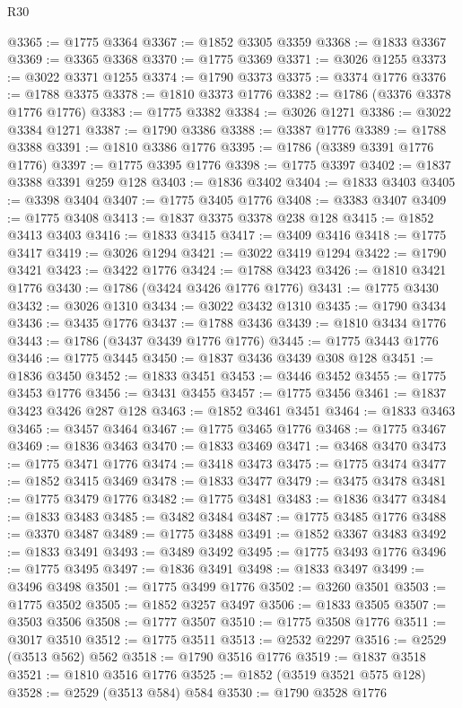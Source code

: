 \begin{lexlean}{R30}
\begin{coremodule}
{{{{{@3365 := @1775 @3364
@3367 := @1852 @3305 @3359
@3368 := @1833 @3367
@3369 := @3365 @3368
@3370 := @1775 @3369
@3371 := @3026 @1255
@3373 := @3022 @3371 @1255
@3374 := @1790 @3373
@3375 := @3374 @1776
@3376 := @1788 @3375
@3378 := @1810 @3373 @1776
@3382 := @1786 (@3376 @3378 @1776 @1776)
@3383 := @1775 @3382
@3384 := @3026 @1271
@3386 := @3022 @3384 @1271
@3387 := @1790 @3386
@3388 := @3387 @1776
@3389 := @1788 @3388
@3391 := @1810 @3386 @1776
@3395 := @1786 (@3389 @3391 @1776 @1776)
@3397 := @1775 @3395 @1776
@3398 := @1775 @3397
@3402 := @1837 @3388 @3391 @259 @128
@3403 := @1836 @3402
@3404 := @1833 @3403
@3405 := @3398 @3404
@3407 := @1775 @3405 @1776
@3408 := @3383 @3407
@3409 := @1775 @3408
@3413 := @1837 @3375 @3378 @238 @128
@3415 := @1852 @3413 @3403
@3416 := @1833 @3415
@3417 := @3409 @3416
@3418 := @1775 @3417
@3419 := @3026 @1294
@3421 := @3022 @3419 @1294
@3422 := @1790 @3421
@3423 := @3422 @1776
@3424 := @1788 @3423
@3426 := @1810 @3421 @1776
@3430 := @1786 (@3424 @3426 @1776 @1776)
@3431 := @1775 @3430
@3432 := @3026 @1310
@3434 := @3022 @3432 @1310
@3435 := @1790 @3434
@3436 := @3435 @1776
@3437 := @1788 @3436
@3439 := @1810 @3434 @1776
@3443 := @1786 (@3437 @3439 @1776 @1776)
@3445 := @1775 @3443 @1776
@3446 := @1775 @3445
@3450 := @1837 @3436 @3439 @308 @128
@3451 := @1836 @3450
@3452 := @1833 @3451
@3453 := @3446 @3452
@3455 := @1775 @3453 @1776
@3456 := @3431 @3455
@3457 := @1775 @3456
@3461 := @1837 @3423 @3426 @287 @128
@3463 := @1852 @3461 @3451
@3464 := @1833 @3463
@3465 := @3457 @3464
@3467 := @1775 @3465 @1776
@3468 := @1775 @3467
@3469 := @1836 @3463
@3470 := @1833 @3469
@3471 := @3468 @3470
@3473 := @1775 @3471 @1776
@3474 := @3418 @3473
@3475 := @1775 @3474
@3477 := @1852 @3415 @3469
@3478 := @1833 @3477
@3479 := @3475 @3478
@3481 := @1775 @3479 @1776
@3482 := @1775 @3481
@3483 := @1836 @3477
@3484 := @1833 @3483
@3485 := @3482 @3484
@3487 := @1775 @3485 @1776
@3488 := @3370 @3487
@3489 := @1775 @3488
@3491 := @1852 @3367 @3483
@3492 := @1833 @3491
@3493 := @3489 @3492
@3495 := @1775 @3493 @1776
@3496 := @1775 @3495
@3497 := @1836 @3491
@3498 := @1833 @3497
@3499 := @3496 @3498
@3501 := @1775 @3499 @1776
@3502 := @3260 @3501
@3503 := @1775 @3502
@3505 := @1852 @3257 @3497
@3506 := @1833 @3505
@3507 := @3503 @3506
@3508 := @1777 @3507
@3510 := @1775 @3508 @1776
@3511 := @3017 @3510
@3512 := @1775 @3511
@3513 := @2532 @2297
@3516 := @2529 (@3513 @562) @562
@3518 := @1790 @3516 @1776
@3519 := @1837 @3518
@3521 := @1810 @3516 @1776
@3525 := @1852 (@3519 @3521 @575 @128)
@3528 := @2529 (@3513 @584) @584
@3530 := @1790 @3528 @1776
}}}}}
\end{coremodule}
\end{lexlean}
